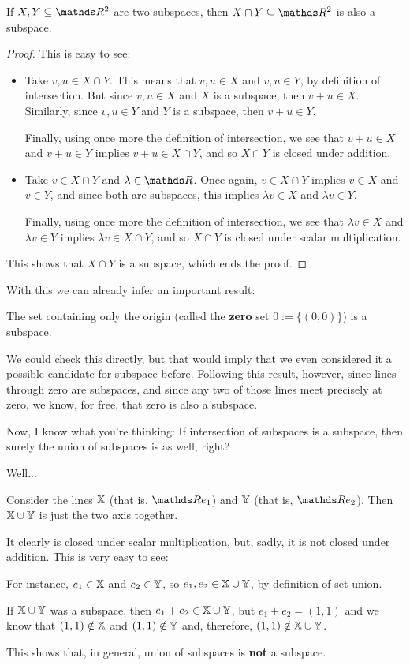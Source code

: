 \begin{lemma}
	If $X,Y\subseteq \R^2$ are two subspaces, then $X\cap Y\subseteq \R^2$ is also a subspace.
\end{lemma}
\begin{proof}
	This is easy to see:
	\begin{itemize}
		\item Take $v,u\in X\cap Y$. This means that $v,u\in X$ and $v,u\in Y$, by definition of intersection. But since $v,u\in X$ and $X$ is a subspace, then $v+u\in X$. Similarly, since $v,u\in Y$ and $Y$ is a subspace, then $v+u\in Y$.
		
		Finally, using once more the definition of intersection, we see that $v+u\in X$ and $v+u\in Y$ implies $v+u\in X\cap Y$, and so $X\cap Y$ is closed under addition.
		
		\item Take $v\in X\cap Y$ and $\lambda\in \R$. Once again, $v\in X\cap Y$ implies $v\in X$ and $v\in Y$, and since both are subspaces, this implies $\lambda v\in X$ and $\lambda v\in Y$.
		
		Finally, using once more the definition of intersection, we see that $\lambda v\in X$ and $\lambda v\in Y$ implies $\lambda v\in X\cap Y$, and so $X\cap Y$ is closed under scalar multiplication.
	\end{itemize}
This shows that $X\cap Y$ is a subspace, which ends the proof.
\end{proof}

With this we can already infer an important result:

\begin{cor}
	The set containing only the origin (called the \textbf{zero} set $0:=\{(0,0)\}$) is a subspace.
\end{cor}

We could check this directly, but that would imply that we even considered it a possible candidate for subspace before. Following this result, however, since lines through zero are subspaces, and since any two of those lines meet precisely at zero, we know, for free, that zero is also a subspace.

\bigskip
Now, I know what you're thinking: If intersection of subspaces is a subspace, then surely the union of subspaces is as well, right?

Well...

\begin{ex}
	Consider the lines $\mathbb X$ (that is, $\R e_1$) and $\mathbb Y$ (that is, $\R e_2$). Then $\mathbb X\cup\mathbb Y$ is just the two axis together.
	
	It clearly is closed under scalar multiplication, but, sadly, it is not closed under addition. This is very easy to see:
	
	For instance, $e_1\in\mathbb X$ and $e_2\in\mathbb Y$, so $e_1,e_2\in \mathbb X\cup \mathbb Y$, by definition of set union.
	
	If $\mathbb X\cup \mathbb Y$ was a subspace, then $e_1+e_2\in \mathbb X\cup \mathbb Y$, but $e_1+e_2=(1,1)$ and we know that $(1,1)\notin \mathbb X$  and $(1,1)\notin \mathbb Y$ and, therefore, $(1,1)\notin \mathbb X\cup \mathbb Y$.
	
	This shows that, in general, union of subspaces is \textbf{not} a subspace.
\end{ex}


